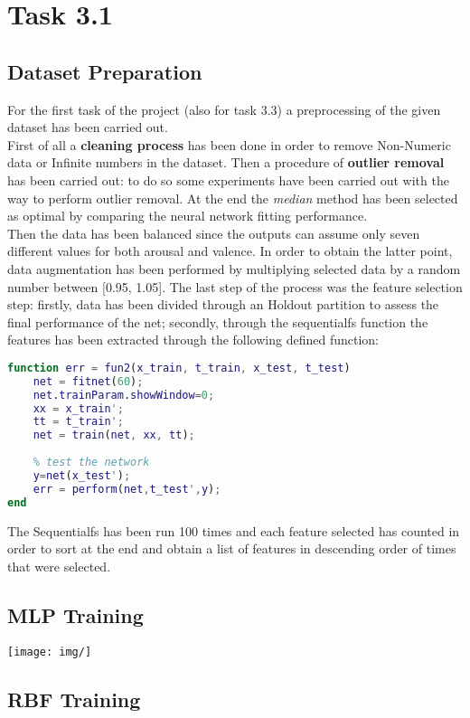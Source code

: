 \section{Task 3.1}
\subsection{Dataset Preparation}
For the first task of the project (also for task 3.3) a preprocessing of the given dataset has been carried out.\\
First of all a \textbf{cleaning process} has been done in order to remove Non-Numeric data or Infinite numbers in the dataset.
Then a procedure of \textbf{outlier removal} has been carried out: to do so some experiments have been carried out with the way to perform outlier removal. At the end the \textit{median} method has been selected as optimal by comparing the neural network fitting performance. \\
Then the data has been balanced since the outputs can assume only seven different values for both arousal and valence. In order to obtain the latter point, data augmentation has been performed by multiplying selected data by a random number between [0.95, 1.05].
The last step of the process was the feature selection step: firstly, data has been divided through an Holdout partition to assess the final performance of the net; secondly, through the sequentialfs function the features has been extracted through the following defined function:


\begin{lstlisting}[language=Matlab]
function err = fun2(x_train, t_train, x_test, t_test)
	net = fitnet(60);
	net.trainParam.showWindow=0;
	xx = x_train';
	tt = t_train';
	net = train(net, xx, tt);
	
	% test the network 
	y=net(x_test'); 
	err = perform(net,t_test',y);
end
\end{lstlisting}

The Sequentialfs has been run 100 times and each feature selected has counted in order to sort at the end and obtain a list of features in descending order of times that were selected.
 
\subsection{MLP Training}
\begin{center}
	\texttt{[image: img/]} 
\end{center}
\subsection{RBF Training}
